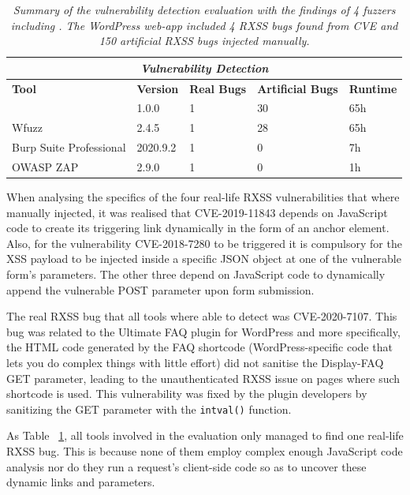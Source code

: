 \begin{table}[ht]
\centering
 \begin{tabular}{@{}|l|l|l|l|l|@{}}
 \hline
  \multicolumn{5}{|c|}{\textit{\textbf{Vulnerability Detection}}} \\
 \hline
 \textbf{Tool} & \textbf{Version} & \textbf{Real Bugs} & \textbf{Artificial Bugs} & \textbf{Runtime} \\ 
 \hline\hline
 \pname{} & 1.0.0 & 1 & 30 & 65h  \\ 
 \hline
 Wfuzz & 2.4.5 & 1 & 28 & 65h  \\ 
 \hline
 Burp Suite Professional & 2020.9.2 & 1 & 0 & 7h \\ 
 \hline
 OWASP ZAP  & 2.9.0 & 1 & 0 & 1h  \\
 \hline
 \end{tabular}
 \captionsetup{justification=centering}
 \caption[Vulnerability detection summary]{\textit{Summary of the vulnerability detection evaluation with the findings of 4 fuzzers including \pname{}. The WordPress web-app included 4 RXSS bugs found from CVE and 150 artificial RXSS bugs injected manually.}}

 \label{tools_table}
\end{table}

When analysing the specifics of the four real-life RXSS vulnerabilities that where manually injected, it was realised that CVE-2019-11843 depends on JavaScript code to create its triggering link dynamically in the form of an anchor element. Also, for the vulnerability CVE-2018-7280 to be triggered it is compulsory for the XSS payload to be injected inside a specific JSON object at one of the vulnerable form's parameters. The other three depend on JavaScript code to dynamically append the vulnerable POST parameter upon form submission. 

The real RXSS bug that all tools where able to detect was CVE-2020-7107. This bug was related to the Ultimate FAQ plugin for WordPress and more specifically, the HTML code generated by the FAQ shortcode (WordPress-specific code that lets you do complex things with little effort) did not sanitise the Display-FAQ GET parameter, leading to the unauthenticated RXSS issue on pages where such shortcode is used. This vulnerability was fixed by the plugin developers by sanitizing the GET parameter with the {\tt intval()} function. 

As Table ~\ref{tools_table}, all tools involved in the evaluation only managed to find one real-life RXSS bug. This is because none of them employ complex enough JavaScript code analysis nor do they run a request's client-side code so as to uncover these dynamic links and parameters.

